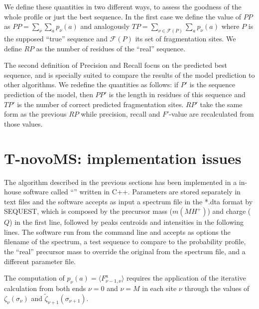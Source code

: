 We define these quantities in two different ways, to assess the goodness of the
whole profile or just the best sequence.
In the first case we define the value of $PP$ as
$PP=\sum_\nu\sum_a p_\nu(a)$ and analogously $TP=\sum_{\nu\in\mathcal
F(P)}\sum_a p_\nu(a)$ where $P$ is the supposed ``true'' sequence and $\mathcal
F(P)$ its set of fragmentation sites.
We define $RP$ as the number of residues of the ``real'' sequence.

The second definition of Precision and Recall focus on the predicted best
sequence, and is specially suited to
compare the results of the model prediction to other algorithms.
We redefine the quantities as follows: if $P'$ is the sequence prediction of
the model, then $PP'$ is the length in residues of this sequence and $TP'$ is
the number of correct predicted fragmentation sites. 
$RP'$ take the same form as the previous $RP$
while precision, recall and $F'$-value are recalculated from those values.


\section{T-novoMS: implementation issues}
\label{sec:msms-issues}

The algorithm described in the previous sections has been implemented in a
in-house software called ``\ournovo'' written in C++.
Parameters are stored separately in text files and the software accepts as input
a spectrum file in the *.dta format by SEQUEST, which is composed by the precursor
mass ($m(MH^+)$) and charge ($Q$) in the first line, followed by peaks centroids
and intensities in the following lines.
The software run from the command line and accepts as options the filename of
the spectrum, a test sequence to
compare to the probability profile, the ``real'' precursor mass to override the
original from the spectrum file, and a different
parameter file.

The computation of $p_\nu(a)=\langle F^{a}_{\nu-1,\nu}\rangle$ requires the
application of the iterative calculation from both ends $\nu=0$ and $\nu=M$
in each site $\nu$ through the values of $\zeta_\nu(\sigma_\nu)$ and
$\tilde\zeta_{\nu+1}(\sigma_{\nu+1})$.

